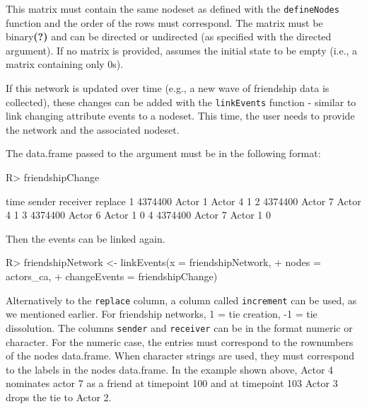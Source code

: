 \documentclass[article]{jss}
\begin{document}
This matrix must contain the same nodeset as defined with the \texttt{defineNodes} function and the order of the rows must correspond. The matrix must be binary\textbf{(?)} and can be directed or undirected (as specified with the directed argument). If no matrix is provided,  assumes the initial state to be empty (i.e., a matrix containing only 0s). 

\newline If this network is updated over time (e.g., a new wave of friendship data is collected), these changes can be added with the \texttt{linkEvents} function - similar to link changing attribute events to a nodeset. This time, the user needs to provide the network and the associated nodeset.

The data.frame passed to the  argument must be in the following format:

%
%

%
\begin{Schunk}
\begin{Sinput}
R> friendshipChange
\end{Sinput}
\begin{Soutput}
     time  sender receiver replace
1 4374400 Actor 1  Actor 4       1
2 4374400 Actor 7  Actor 4       1
3 4374400 Actor 6  Actor 1       0
4 4374400 Actor 7  Actor 1       0
\end{Soutput}
\end{Schunk}
%
Then the events can be linked again. 
%
\begin{Schunk}
\begin{Sinput}
R> friendshipNetwork <- linkEvents(x = friendshipNetwork,
+                                  nodes = actors_ca,
+                                  changeEvents = friendshipChange)
\end{Sinput}
\end{Schunk}
%

Alternatively to the \texttt{replace} column, a column called  \texttt{increment} can be used, as we mentioned earlier. For friendship networks, 1 = tie creation, -1 = tie dissolution. The columns  \texttt{sender} and  \texttt{receiver} can be in the format numeric or character. For the numeric case, the entries must correspond to the rownumbers of the nodes data.frame. When character strings are used, they must correspond to the labels in the nodes data.frame. In the example shown above, Actor 4 nominates actor 7 as a friend at timepoint 100 and at timepoint 103 Actor 3 drops the tie to Actor 2.
\end{document}
